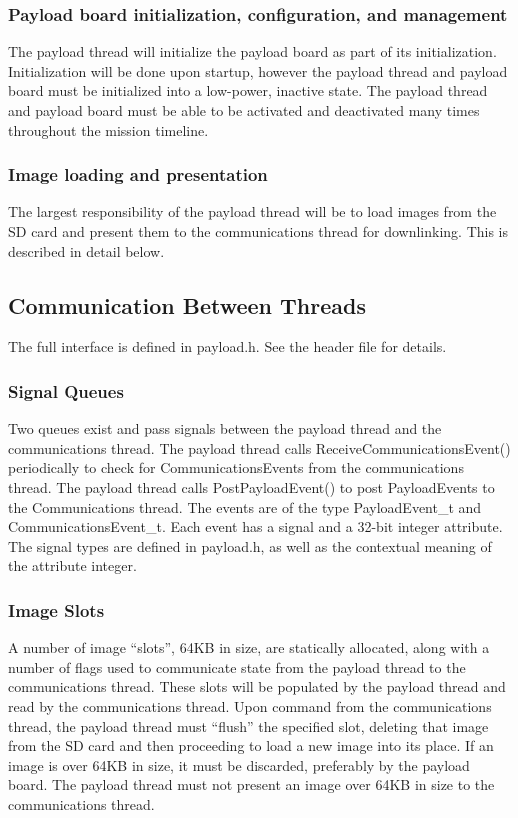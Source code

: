 \documentclass[10pt]{extarticle}
\begin{document}
\subsubsection{Payload board initialization, configuration, and management}
The payload thread will initialize the payload board as part of its initialization.
Initialization will be done upon startup, however the payload thread and payload
board must be initialized into a low-power, inactive state. The payload thread
and payload board must be able to be activated and deactivated many times
throughout the mission timeline.

\subsubsection{Image loading and presentation}
The largest responsibility of the payload thread will be to load images from 
the SD card and present them to the communications thread for downlinking. This
is described in detail below.

\subsection{Communication Between Threads}
The full interface is defined in payload.h. See the header file for details.
\subsubsection{Signal Queues}
Two queues exist and pass signals between the payload thread and the
communications thread. The payload thread calls ReceiveCommunicationsEvent()
periodically to check for CommunicationsEvents from the
communications thread. The payload thread calls PostPayloadEvent() to post 
PayloadEvents to the Communications thread. The events are of the type
PayloadEvent\_t and CommunicationsEvent\_t. Each event has a signal and a 32-bit
integer attribute. The signal types are defined in payload.h, as well as the
contextual meaning of the attribute integer.

\subsubsection{Image Slots}
A number of image ``slots'', 64KB in size, are statically allocated,
along with a number of flags  used to communicate state from the payload thread
to the communications thread. These slots will be
populated by the payload thread and read by the communications thread. Upon
command from the communications thread, the payload thread must ``flush'' the
specified slot, deleting that image from the SD card and then proceeding to
load a new image into its place. If an image is over 64KB in size, it must be
discarded, preferably by the payload board. The payload thread must not present
an image over 64KB in size to the communications thread.
\end{document}
